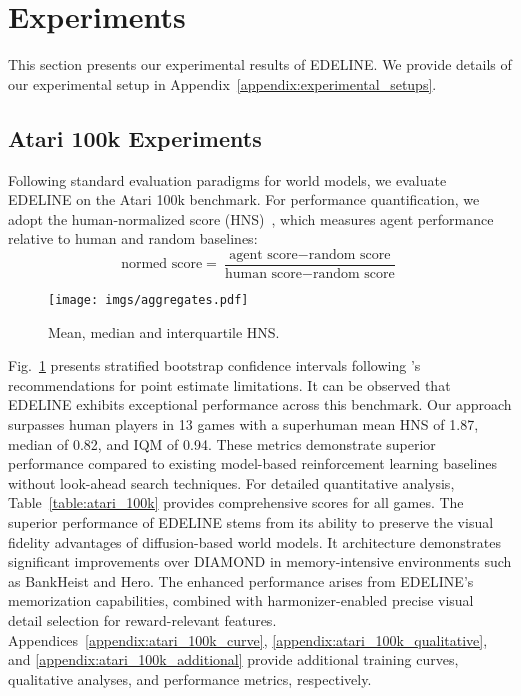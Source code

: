 \section{Experiments}

This section presents our experimental results of EDELINE. We provide details of our experimental setup in Appendix~\ref{appendix:experimental_setups}.
\vspace{-2em}

\subsection{Atari 100k Experiments}
\label{subsec:atari_100k_experiments}

Following standard evaluation paradigms for world models, we evaluate EDELINE on the Atari 100k benchmark. For performance quantification, we adopt the human-normalized score (HNS)~\cite{pmlr-v48-wangf16dueling}, which measures agent performance relative to human and random baselines:
\begin{equation}
    \text{normed score} = \frac{\text{agent score} - \text{random score}}{\text{human score} - \text{random score}}
\end{equation}

\begin{figure}[ht]
    \centering
    \texttt{[image: imgs/aggregates.pdf]}

    \caption{Mean, median and interquartile HNS.}
    \label{fig:human_normalized_score}
    \vspace{-0.5em}
\end{figure}

Fig.~\ref{fig:human_normalized_score} presents stratified bootstrap confidence intervals following \citet{agarwal2021deep}'s recommendations for point estimate limitations. It can be observed that EDELINE exhibits exceptional performance across this benchmark. Our approach surpasses human players in 13 games with a superhuman mean HNS of 1.87, median of 0.82, and IQM of 0.94. These metrics demonstrate superior performance compared to existing model-based reinforcement learning baselines without look-ahead search techniques. For detailed quantitative analysis, Table~\ref{table:atari_100k} provides comprehensive scores for all games. The superior performance of EDELINE stems from its ability to preserve the visual fidelity advantages of diffusion-based world models. It architecture demonstrates significant improvements over DIAMOND in memory-intensive environments such as BankHeist and Hero. The enhanced performance arises from EDELINE’s  memorization capabilities, combined with harmonizer-enabled precise visual detail selection for reward-relevant features. 
Appendices~\ref{appendix:atari_100k_curve}, \ref{appendix:atari_100k_qualitative}, and \ref{appendix:atari_100k_additional} provide additional training curves, qualitative analyses, and performance metrics, respectively.

